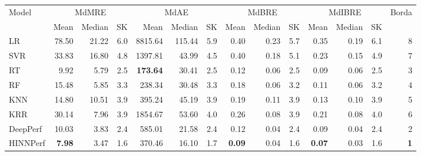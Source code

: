 \begin{tabular}{lrrrrrrrrrrrrr}
\toprule
Model & \multicolumn{3}{c}{MdMRE} & \multicolumn{3}{c}{MdAE} & \multicolumn{3}{c}{MdBRE} & \multicolumn{3}{c}{MdIBRE} & Borda \\
 & Mean & Median & SK & Mean & Median & SK & Mean & Median & SK & Mean & Median & SK &  \\
\midrule
LR & 78.50 & 21.22 & 6.0 & 8815.64 & 115.44 & 5.9 & 0.40 & 0.23 & 5.7 & 0.35 & 0.19 & 6.1 & 8 \\
SVR & 33.83 & 16.80 & 4.8 & 1397.81 & 43.99 & 4.5 & 0.40 & 0.18 & 5.1 & 0.23 & 0.15 & 4.9 & 7 \\
RT & 9.92 & 5.79 & 2.5 & \textbf{173.64} & 30.41 & 2.5 & 0.12 & 0.06 & 2.5 & 0.09 & 0.06 & 2.5 & 3 \\
RF & 15.48 & 5.85 & 3.3 & 238.34 & 30.48 & 3.3 & 0.18 & 0.06 & 3.2 & 0.11 & 0.06 & 3.2 & 4 \\
KNN & 14.80 & 10.51 & 3.9 & 395.24 & 45.19 & 3.9 & 0.19 & 0.11 & 3.9 & 0.13 & 0.10 & 3.9 & 5 \\
KRR & 30.14 & 7.96 & 3.9 & 1854.67 & 53.60 & 4.0 & 0.26 & 0.08 & 3.9 & 0.21 & 0.08 & 4.0 & 6 \\
DeepPerf & 10.03 & 3.83 & 2.4 & 585.01 & 21.58 & 2.4 & 0.12 & 0.04 & 2.4 & 0.09 & 0.04 & 2.4 & 2 \\
HINNPerf & \textbf{7.98} & 3.47 & 1.6 & 370.46 & 16.10 & 1.7 & \textbf{0.09} & 0.04 & 1.6 & \textbf{0.07} & 0.03 & 1.6 & \textbf{1} \\
\bottomrule
\end{tabular}
